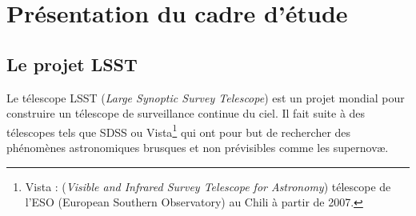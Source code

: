 
\section{Présentation du cadre d'étude}

	\subsection{Le projet LSST}

Le télescope LSST (\emph{Large Synoptic Survey Telescope}) est un projet mondial pour construire un télescope de surveillance continue du ciel. Il fait suite à des télescopes tels que SDSS ou Vista\footnote{Vista : (\emph{Visible and Infrared Survey Telescope for Astronomy}) télescope de l'ESO (European Southern Observatory) au Chili à partir de 2007.} qui ont pour but de rechercher des phénomènes astronomiques brusques et non prévisibles comme les supernovæ.


